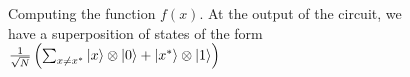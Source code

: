 \begin{figure}
\centering



\caption{Computing the function $f\left(x\right)$. At the output of the circuit, we have
  a superposition of states of the form 
$\frac{1}{\sqrt{N}}\left(
 \sum_{x \ne x^{\ast}} \ket{x}\otimes\ket{0}
+ \left|x^{\ast}\right>\otimes\ket{1}
\right)$}
\label{figQuantCompGrover1}
\end{figure}